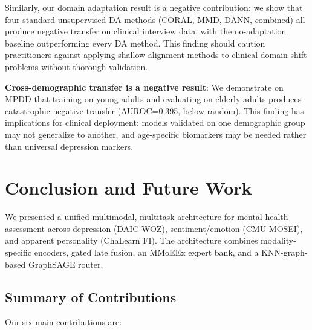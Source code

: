 \documentclass[12pt,oneside]{book}
\begin{document}
\begin{itemize}
Similarly, our domain adaptation result is a negative contribution: we show that four standard unsupervised DA methods (CORAL, MMD, DANN, combined) all produce negative transfer on clinical interview data, with the no-adaptation baseline outperforming every DA method. This finding should caution practitioners against applying shallow alignment methods to clinical domain shift problems without thorough validation.

\textbf{Cross-demographic transfer is a negative result}: We demonstrate on MPDD that training on young adults and evaluating on elderly adults produces catastrophic negative transfer (AUROC=0.395, below random). This finding has implications for clinical deployment: models validated on one demographic group may not generalize to another, and age-specific biomarkers may be needed rather than universal depression markers.

\section{Conclusion and Future Work}
\label{sec:conclusion}
We presented a unified multimodal, multitask architecture for mental health assessment across depression (DAIC-WOZ), sentiment/emotion (CMU-MOSEI), and apparent personality (ChaLearn FI). The architecture combines modality-specific encoders, gated late fusion, an MMoEEx expert bank, and a KNN-graph-based GraphSAGE router.

\subsection{Summary of Contributions}

Our six main contributions are:


\end{itemize}
\end{document}
